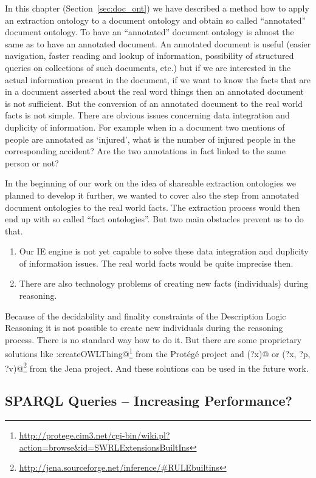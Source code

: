 In this chapter (Section~\ref{sec:doc_ont}) we have described a method how to apply an extraction ontology to a document ontology and obtain so called ``annotated'' document ontology. To have an ``annotated'' document ontology is almost the same as to have an annotated document. An annotated document is useful (easier navigation, faster reading and lookup of information, possibility of structured queries on collections of such documents, etc.) but if we are interested in the actual information present in the document, if we want to know the facts that are in a document asserted about the real word things then an annotated document is not sufficient. But the conversion of an annotated document to the real world facts is not simple.
There are obvious issues concerning data integration and duplicity of information. For example when in a document two mentions of people are annotated as `injured', what is the number of injured people in the corresponding accident? Are the two annotations in fact linked to the same person or not?

In the beginning of our work on the idea of shareable extraction ontologies we planned to develop it further, we wanted to cover also the step from annotated document ontologies to the real world facts. The extraction process would then end up with so called ``fact ontologies''. But two main obstacles prevent us to do that.

\begin{enumerate}
	\item Our IE engine is not yet capable to solve these data integration and duplicity of information issues. The real world facts would be quite imprecise then.
	\item There are also technology problems of creating new facts (individuals) during reasoning.
\end{enumerate}

Because of the decidability and finality constraints of the Description Logic Reasoning it is not possible to create new individuals during the reasoning process. There is no standard way how to do it. But there are some proprietary solutions like \verb@swrlx:createOWLThing@\footnote{\url{http://protege.cim3.net/cgi-bin/wiki.pl?action=browse&id=SWRLExtensionsBuiltIns}} from the Prot\'{e}g\'{e} project and \verb@makeTemp(?x)@ or \verb@makeInstance(?x, ?p, ?v)@\footnote{\url{http://jena.sourceforge.net/inference/#RULEbuiltins}} from the Jena project.
And these solutions can be used in the future work. 

\subsection{SPARQL Queries -- Increasing Performance?}

